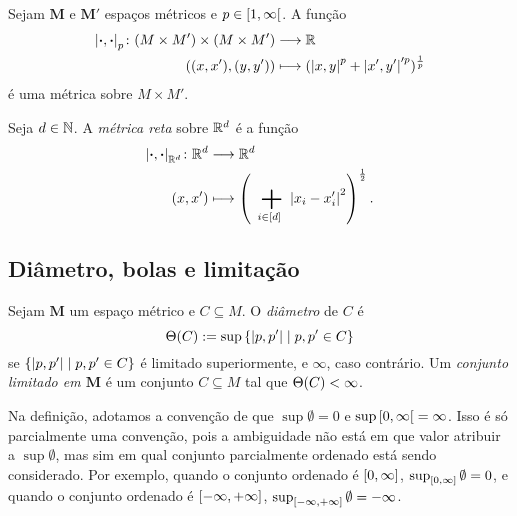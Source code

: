 \begin{exercise}[Métricas $p$]
Sejam $\bm M$ e $\bm M'$ espaços métricos e $p \in \left[{1},{\infty}\right[$.
A função
	\begin{align*}
	{\left\vert{\bm{\cdot}},{\bm{\cdot}}\right\vert_p}\colon {(M \times M') \times (M \times M')} &\longrightarrow {\mathbb{R}} \\{((x,x'),(y,y'))} &\longmapsto (\left\vert{x},{y}\right\vert^p + \left\vert{x'},{y'}\right\vert'^p)^{\frac{1}{p}}
	\end{align*}
é uma métrica sobre $M \times M'$.
\end{exercise}

\begin{definition}
Seja $d \in \mathbb{N}$. A \emph{métrica reta} sobre $\mathbb{R}^d$ é a função
	\begin{align*}
	\func{\dist{\var}{\var}_{\R^d}}{\R^d}{\R^d}{(x,x')}{\left( \sum_{i \in [d]} \abs{x_i-x'_i}^2 \right)^{\frac{1}{2}}}.
	\end{align*}
\end{definition}





\subsection{Diâmetro, bolas e limitação}

\begin{definition}
Sejam $\bm M$ um espaço métrico e $C \subseteq M$. O \emph{diâmetro} de $C$ é
	\begin{equation*}
	\Theta(C) := \sup\left\{{\left\vert{p},{p'}\right\vert}\;\middle\vert\;{p,p' \in C}\right\}
	\end{equation*}
se $\left\{{\left\vert{p},{p'}\right\vert}\;\middle\vert\;{p,p' \in C}\right\}$ é limitado superiormente, e $\infty$, caso contrário. Um \emph{conjunto limitado em $\bm M$} é um conjunto $C \subseteq M$ tal que $\Theta(C) < \infty$.
\end{definition}

Na definição, adotamos a convenção de que $\sup \emptyset = 0$ e $\sup \left[{0},{\infty}\right[ = \infty$. Isso é só parcialmente uma convenção, pois a ambiguidade não está em que valor atribuir a $\sup \emptyset$, mas sim em qual conjunto parcialmente ordenado está sendo considerado. Por exemplo, quando o conjunto ordenado é $\left[{0},{\infty}\right]$, $\sup_{\left[{0},{\infty}\right]} \emptyset = 0$, e quando o conjunto ordenado é $\left[{-\infty},{+\infty}\right]$, $\sup_{\left[{-\infty},{+\infty}\right]} \emptyset = -\infty$.

